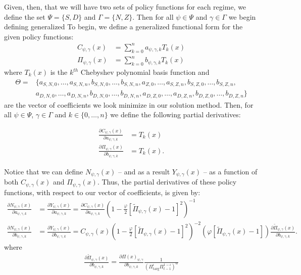 \documentclass[11pt]{article}
\begin{document}
Given, then, that we will have two sets of policy functions for each regime, we define the set $\Psi =\{S,D\}$ and $\Gamma = \{N,Z\}$. Then for all $\psi\in\Psi$ and $\gamma\in\Gamma$ we begin defining generalized To begin, we define a generalized functional form for the given policy functions:
\begin{align}
C_{\psi,\gamma}(x) &= \sum_{k=0}^{n}a_{\psi,\gamma,k}T_k(x) \\ 
\Pi_{\psi,\gamma}(x) &= \sum_{k=0}^{n}b_{\psi,\gamma,k}T_k(x)
\end{align}
where $T_k(x)$ is the $k^{th}$ Chebyshev polynomial basis function and 
\begin{align}
\Theta = & \{a_{S,N,0},\dots,a_{S,N,n},b_{S,N,0},\dots,b_{S,N,n},a_{Z,0},\dots,a_{S,Z,n},b_{S,Z,0},\dots,b_{S,Z,n},\nonumber \\
& a_{D,N,0},\dots,a_{D,N,n},b_{D,N,0},\dots,b_{D,N,n},a_{D,Z,0},\dots,a_{D,Z,n},b_{D,Z,0},\dots,b_{D,Z,n}\} 
\end{align}
are the vector of coefficients we look minimize in our solution method. Then, for all $\psi\in\Psi$, $\gamma\in\Gamma$ and $k\in\{0,\dots,n\}$ we define the following partial derivatives:

\begin{align}
\frac{\partial C_{\psi,\gamma}(x)}{\partial a_{\psi,\gamma,k}} &= T_k(x) \\ 
\frac{\partial \Pi_{\psi,\gamma}(x)}{\partial b_{\psi,\gamma,k}} &= T_k(x).
\end{align}

Notice that we can define $N_{\psi,\gamma}(x)$ -- and as a result $Y_{\psi,\gamma}(x)$ --  as a function of both $C_{\psi,\gamma}(x)$ and $\Pi_{\psi,\gamma}(x)$. Thus, the partial derivatives of these policy functions, with respect to our vector of coefficients, is given by: 
\begin{align}
\frac{\partial N_{\psi,\gamma}(x)}{\partial a_{\psi,\gamma,k}} &= \frac{\partial Y_{\psi,\gamma}(x)}{\partial a_{\psi,\gamma,k}} = \frac{\partial C_{\psi,\gamma}(x)}{\partial a_{\psi,\gamma,k}}\left(1-\frac{\varphi}{2}\left[\tilde{\Pi}_{\psi,\gamma}(x) -1\right]^2\right)^{-1}\\ 
\frac{\partial N_{\psi,\gamma}(x)}{\partial b_{\psi,\gamma,k}} &= \frac{\partial Y_{\psi,\gamma}(x)}{\partial b_{\psi,\gamma,k}} = C_{\psi,\gamma}(x)\left(1-\frac{\varphi}{2}\left[\tilde{\Pi}_{\psi,\gamma}(x) -1\right]^2\right)^{-2}\left(\varphi\left[\tilde{\Pi}_{\psi,\gamma}(x) -1\right]\right)\frac{\partial \tilde{\Pi}_{\psi,\gamma}(x)}{\partial b_{\psi,\gamma,k}}.
\end{align}
where 
\begin{align}
\frac{\partial \tilde{\Pi}_{\psi,\gamma}(x)}{\partial b_{\psi,\gamma,k}} = \frac{\partial \Pi(x)_{\psi,\gamma}}{\partial b_{\psi,\gamma,k}}\frac{1}{\left(\Pi_{\text{targ}}^{\iota}\Pi_{t-1}^{1-\iota}\right)^{\alpha}}
\end{align}
\end{document}
